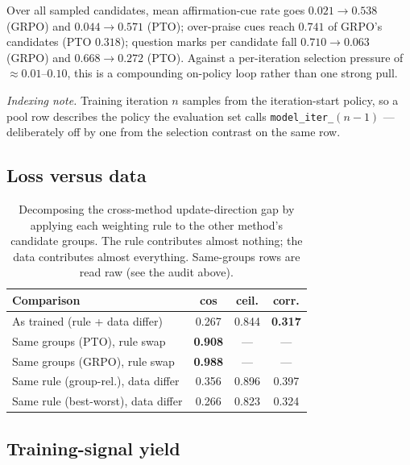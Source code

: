 Over all sampled candidates, mean affirmation-cue rate goes $0.021 \to 0.538$ (GRPO) and
$0.044 \to 0.571$ (PTO); over-praise cues reach $0.741$ of GRPO's candidates (PTO $0.318$);
question marks per candidate fall $0.710 \to 0.063$ (GRPO) and $0.668 \to 0.272$ (PTO).
Against a per-iteration selection pressure of ${\approx}0.01$--$0.10$, this is a compounding
on-policy loop rather than one strong pull.

\emph{Indexing note.} Training iteration $n$ samples from the iteration-start policy, so a
pool row describes the policy the evaluation set calls \texttt{model\_iter\_}$(n{-}1)$ ---
deliberately off by one from the selection contrast on the same row.

\subsection{Loss versus data}

\begin{table}[h]
  \centering\small
  \setlength{\tabcolsep}{4pt}
  \begin{tabular}{@{}lccc@{}}
    \toprule
    Comparison & cos & ceil. & corr.\\
    \midrule
    As trained (rule + data differ) & 0.267 & 0.844 & \textbf{0.317}\\
    Same groups (PTO), rule swap    & \textbf{0.908} & --- & ---\\
    Same groups (GRPO), rule swap   & \textbf{0.988} & --- & ---\\
    Same rule (group-rel.), data differ & 0.356 & 0.896 & 0.397\\
    Same rule (best-worst), data differ & 0.266 & 0.823 & 0.324\\
    \bottomrule
  \end{tabular}
  \caption{Decomposing the cross-method update-direction gap by applying each weighting rule
  to the other method's candidate groups. The rule contributes almost nothing; the data
  contributes almost everything. Same-groups rows are read raw (see the audit above).}
  \label{tab:decomp}
\end{table}

\subsection{Training-signal yield}

